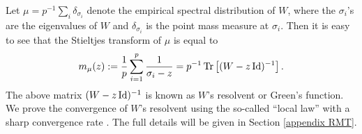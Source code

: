 Let $\mu=p^{-1}\sum_{i} \delta_{\sigma_i}$ denote the empirical spectral distribution of $W$, where the $\sigma_i$'s are the eigenvalues of $W$ and $\delta_{\sigma_i}$ is the point mass measure at $\sigma_i$. Then it is easy to see that the Stieltjes transform of $\mu$ is equal to
 \[ m_{\mu}(z) := \frac{1}{p}\sum_{i=1}^p \frac{1}{\sigma_i - z}= p^{-1}\operatorname{Tr}\left[(W-z\operatorname{Id})^{-1}\right]. \]
The above matrix $(W - z\operatorname{Id})^{-1}$ is known as $W$'s resolvent or Green's function.
We prove the convergence of $W$'s resolvent using the so-called ``local law'' with a sharp convergence rate \cite{isotropic,erdos2017dynamical,Anisotropic}. The full details will be given in Section \ref{appendix RMT}.



